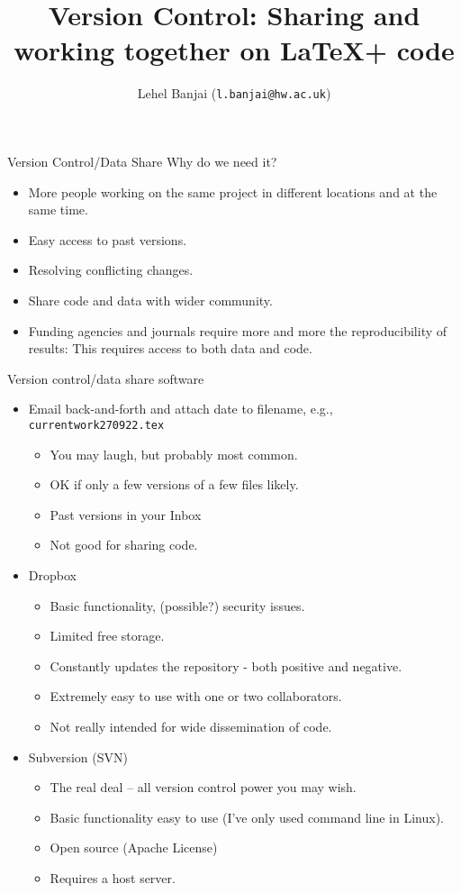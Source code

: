 \documentclass{beamer}
\title[MAC-MIGS Induction: Collaboration]{Version Control: Sharing and working together  on \LaTeX + code}
\author[L. Banjai]{ Lehel Banjai (\texttt{l.banjai@hw.ac.uk})}
\begin{document}
\frame{\titlepage
}

\begin{frame}{Version Control/Data Share}
  Why do we need it?

  \begin{itemize}
  \item More people working on the same project in different locations  and at the same time.
   \item Easy access to past versions.
\item Resolving conflicting changes.
    \item Share code and data with wider community.
    \item Funding agencies and journals require more and more the reproducibility of results: This requires access to both data and code.
  \end{itemize}
\end{frame}

\begin{frame}{Version control/data share software}

 \begin{itemize}
 \item Email back-and-forth and attach date to filename, e.g., {\texttt{currentwork270922.tex}} 
   \begin{itemize}
   \item You may laugh, but probably most common.
   \item OK if only a few versions of a few files likely.
     \item Past versions in your Inbox
      \item Not good for sharing code.\pause
   \end{itemize}
\item Dropbox 
  \begin{itemize}
  \item Basic functionality, (possible?) security issues.
  \item Limited free storage.
   \item Constantly updates the repository - both positive and negative.
  \item Extremely easy to  use  with one or two collaborators.  
  \item Not really intended for wide dissemination of code.\pause
  \end{itemize}
\item Subversion (SVN)
  \begin{itemize}
  \item The real deal -- all version control power you may wish.
  \item Basic functionality easy to use (I've only used command line in Linux).
  \item Open source (Apache License)
  \item Requires a host server.
  \end{itemize}
 \end{itemize}
\end{frame}
\end{document}
